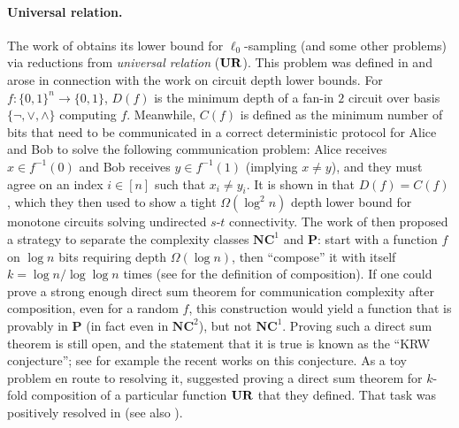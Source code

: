 \vspace{-.1in}\paragraph{Universal relation.} The work of \cite{JowhariST11} obtains its lower bound for $\ell_0$-sampling (and some other problems) via reductions from {\em universal relation} ($\mathbf{UR}$). This problem was defined in \cite{KarchmerRW95} and arose in connection with the work \cite{KarchmerW90} on circuit depth lower bounds. For $f:\{0,1\}^n\rightarrow\{0,1\}$, $D(f)$ is the minimum depth of a fan-in $2$ circuit over basis $\{\neg, \vee, \wedge\}$ computing $f$. Meanwhile, $C(f)$ is defined as the minimum number of bits that need to be communicated in a correct deterministic protocol for Alice and Bob to solve the following communication problem: Alice receives $x\in f^{-1}(0)$ and Bob receives $y\in f^{-1}(1)$ (implying $x\neq y$), and they must agree on an index $i\in[n]$ such that $x_i\neq y_i$. It is shown in \cite{KarchmerW90} that $D(f) = C(f)$, which they then used to show a tight $\Omega(\log^2 n)$ depth lower bound for monotone circuits solving undirected $s$-$t$ connectivity. The work of \cite{KarchmerRW95} then proposed a strategy to separate the complexity classes $\mathbf{NC}^1$ and $\mathbf{P}$: start with a function $f$ on $\log n$ bits requiring depth $\Omega(\log n)$, then ``compose'' it with itself $k = \log n / \log\log n$ times (see \cite{KarchmerW90} for the definition of composition). If one could prove a strong enough direct sum theorem for communication complexity after composition, even for a random $f$, this construction would yield a function that is provably in $\mathbf{P}$ (in fact even in $\mathbf{NC}^2$), but not $\mathbf{NC}^1$. Proving such a direct sum theorem is still open, and the statement that it is true is known as the ``KRW conjecture''; see for example the recent works \cite{GavinskyMWW14,DinurM16} on this conjecture. As a toy problem en route to resolving it, \cite{KarchmerRW95} suggested proving a direct sum theorem for $k$-fold composition of a particular function $\mathbf{UR}$ that they defined. That task was positively resolved in \cite{EIRS91} (see also \cite{HastadW90}).


